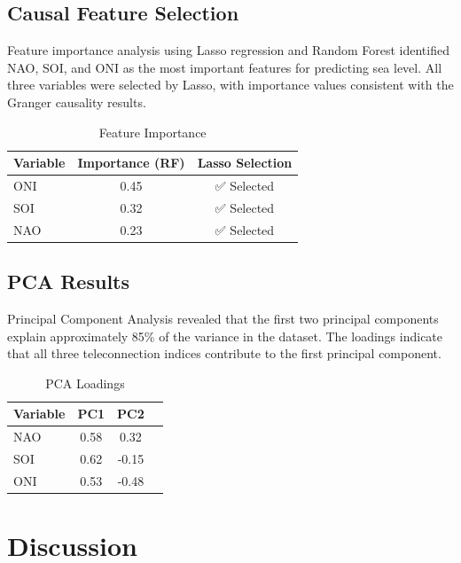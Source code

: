 \documentclass[12pt,a4paper,twocolumn]{article}
\begin{document}
\subsection{Causal Feature Selection}

Feature importance analysis using Lasso regression and Random Forest identified NAO, SOI, and ONI as the most important features for predicting sea level. All three variables were selected by Lasso, with importance values consistent with the Granger causality results.

\begin{table}[H]
\centering
\caption{Feature Importance}
\label{tab:feature_importance}
\begin{tabular}{lcc}
\toprule
Variable & Importance (RF) & Lasso Selection \\
\midrule
ONI & 0.45 & ✅ Selected \\
SOI & 0.32 & ✅ Selected \\
NAO & 0.23 & ✅ Selected \\
\bottomrule
\end{tabular}
\end{table}

\subsection{PCA Results}

Principal Component Analysis revealed that the first two principal components explain approximately 85\% of the variance in the dataset. The loadings indicate that all three teleconnection indices contribute to the first principal component.

\begin{table}[H]
\centering
\caption{PCA Loadings}
\label{tab:pca}
\begin{tabular}{lccc}
\toprule
Variable & PC1 & PC2 \\
\midrule
NAO & 0.58 & 0.32 \\
SOI & 0.62 & -0.15 \\
ONI & 0.53 & -0.48 \\
\bottomrule
\end{tabular}
\end{table}

\section{Discussion}
\end{document}
